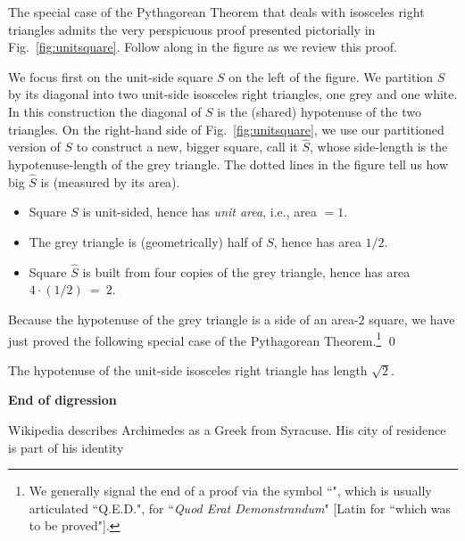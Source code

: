 The special case of the Pythagorean Theorem that deals with isosceles right triangles admits the very perspicuous proof presented pictorially in Fig.~\ref{fig:unitsquare}.  Follow along in the figure as we review this proof.

\smallskip

We focus first on the unit-side square $S$ on the left of the figure.  We partition $S$ by its diagonal into two unit-side isosceles right triangles, one grey and one white.  In this construction the diagonal of $S$ is the (shared) hypotenuse of the two triangles.  On the right-hand side of Fig.~\ref{fig:unitsquare}, we use our partitioned version of $S$ to construct a new, bigger square, call it $\widehat{S}$, whose side-length is the hypotenuse-length of the grey triangle.  The dotted lines in the figure tell us how big $\widehat{S}$ is (measured by its area).
\begin{itemize}
\item
Square $S$ is unit-sided, hence has {\em unit area}, i.e., area $=1$.
\medskip\item
The grey triangle is (geometrically) half of $S$, hence has area $1/2$.
\medskip\item
Square $\widehat{S}$ is built from four copies of the grey triangle, hence has area $4 \cdot (1/2) \ = \ 2$.
\end{itemize}
Because the hypotenuse of the grey triangle is a side of an area-$2$ square, we have just proved the following special case of the Pythagorean Theorem.\footnote{We generally signal the end of a proof via the symbol ``\fbox{\hspace*{.025in}}", which is usually articulated ``Q.E.D.", for ``{\em Quod Erat Demonstrandum}" [Latin for ``which was to be proved"].}  \qed

\begin{prop}
\label{thm:unit-isosceles-PythThm}
The hypotenuse of the unit-side isosceles right triangle has length $\sqrt{2}$.
\end{prop}
  
\noindent \textbf{End of digression}

\bigskip


{\Arny Wikipedia describes Archimedes as a Greek from Syracuse.  His city of residence is part of his identity}

